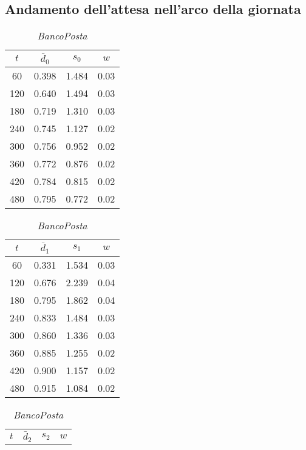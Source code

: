 \subsection*{Andamento dell'attesa nell'arco della giornata}
\captionsetup[table]{justification=centering}
\begin{table}[ht]
\centering
\begin{subtable}[t]{0.33\textwidth}
\centering
{\tablecolors
\begin{tabular}{|c|c|c|c|}
\hline
$t$ & $\bar{d}_0$ & $s_0$ & $w$\\
\hline
60 & 0.398 & 1.484 & 0.03 \\
\hline
120 & 0.640 & 1.494 & 0.03 \\
\hline
180 & 0.719 & 1.310 & 0.03 \\
\hline
240 & 0.745 & 1.127 & 0.02 \\
\hline
300 & 0.756 & 0.952 & 0.02 \\
\hline
360 & 0.772 & 0.876 & 0.02 \\
\hline
420 & 0.784 & 0.815 & 0.02 \\
\hline
480 & 0.795 & 0.772 & 0.02 \\
\hline
\end{tabular}}
\caption{\uo{} \textsl{BancoPosta}}
\end{subtable}%
\begin{subtable}[t]{0.33\textwidth}
\centering
{\tablecolors
\begin{tabular}{|c|c|c|c|}
\hline
$t$ & $\bar{d}_1$ & $s_1$ & $w$\\
\hline
60 & 0.331 & 1.534 & 0.03 \\
\hline
120 & 0.676 & 2.239 & 0.04 \\
\hline
180 & 0.795 & 1.862 & 0.04 \\
\hline
240 & 0.833 & 1.484 & 0.03 \\
\hline
300 & 0.860 & 1.336 & 0.03 \\
\hline
360 & 0.885 & 1.255 & 0.02 \\
\hline
420 & 0.900 & 1.157 & 0.02 \\
\hline
480 & 0.915 & 1.084 & 0.02 \\
\hline
\end{tabular}}
\caption{\pp{} \textsl{BancoPosta}}
\end{subtable}%
\begin{subtable}[t]{0.33\textwidth}
\centering
{\tablecolors
\begin{tabular}{|c|c|c|c|}
\hline
$t$ & $\bar{d}_2$ & $s_2$ & $w$\\

\end{tabular}}
\end{subtable}
\end{table}

